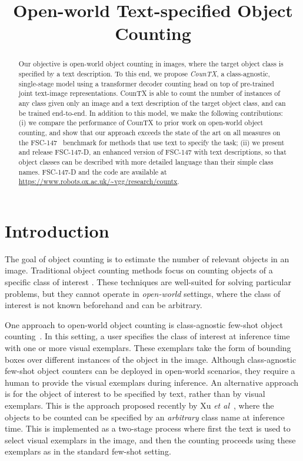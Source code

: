 \documentclass{bmvc2k}
\title{Open-world Text-specified Object Counting}
\def\etal{\emph{et al}\bmvaOneDot}
\begin{document}
\maketitle

\begin{abstract}
Our objective is open-world object counting in images, where the target object class is specified by a text description. To this end, we propose {\em CounTX}, a class-agnostic, single-stage model using a transformer decoder counting head on top of pre-trained joint text-image representations. CounTX is able to count the number of instances of any class given only an image and a text description of the target object class, and can be trained end-to-end. 
In addition to this model, we make the following contributions: (i) we compare the performance of CounTX to prior work on open-world object counting, and show that our approach exceeds the state of the art on all measures on the FSC-147~\cite{m_Ranjan-etal-CVPR21} benchmark for methods that use text to specify the task; (ii) we present and release FSC-147-D, an enhanced version of FSC-147 with text descriptions, so that object classes can be described with more detailed language than their simple class names. FSC-147-D and the code are available at \href{https://www.robots.ox.ac.uk/~vgg/research/countx}{https://www.robots.ox.ac.uk/\textasciitilde vgg/research/countx}.



\end{abstract} 
\raggedbottom
\section{Introduction}
\label{sec:intro}
The goal of object counting is to estimate the number of relevant objects in an image. Traditional object counting methods focus on counting objects of a specific class of interest \cite{10.1007/978-3-031-19821-2_11, artetaCountingWild2016, mundhenkLargeContextualDataset2016a, doi:10.1080/21681163.2016.1149104}. These techniques are well-suited for solving particular problems, but they cannot operate in {\em open-world} settings, where the class of interest is not known beforehand and can be arbitrary.

One approach to open-world object counting is class-agnostic few-shot object counting~\cite{luClassAgnosticCounting2019, yangClassagnosticFewshotObject2021}. In this setting, a user specifies the class of interest at inference time with one or more visual exemplars. These exemplars take the form of bounding boxes over different instances of the object in the image. Although class-agnostic few-shot object counters can be deployed in open-world scenarios, they require a human to provide the visual exemplars during inference. An alternative approach is for the object of interest to be specified by text, rather than by visual exemplars. This is the approach proposed recently by Xu \etal~\cite{Xu2023ZeroshotOC}, where the objects to be counted can be specified by an \emph{arbitrary} class name at inference time. This is implemented as a two-stage process where first the text is used to select visual exemplars in the image, and then the counting proceeds using these exemplars as in the standard few-shot setting.
\end{document}
